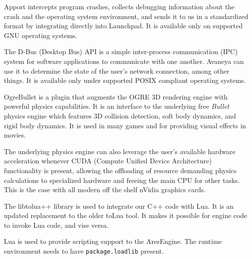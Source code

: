 \startitemize[4]
\setupwhitespace[big]

Apport intercepts program crashes, collects debugging information about the crash and the operating system environment, and sends it to us in a standardized format by integrating directly into Launchpad. It is available only on supported GNU operating systems.


The D-Bus (Desktop Bus) API is a simple inter-process communication (IPC) system for software applications to communicate with one another. Avaneya can use it to determine the state of the user's network connection, among other things. It is available only under supported POSIX compliant operating systems.
\stopitemize


\startitemize[4]
\setupwhitespace[big]

OgreBullet is a plugin that augments the OGRE 3D rendering engine with powerful physics capabilities. It is an interface to the underlying free {\it Bullet} physics engine which features 3D collision detection, soft body dynamics, and rigid body dynamics. It is used in many games and for providing visual effects in movies. 

The underlying physics engine can also leverage the user's available hardware acceleration whenever CUDA (Compute Unified Device Architecture) functionality is present, allowing the offloading of resource demanding physics calculations to specialized hardware and freeing the main CPU for other tasks. This is the case with all modern off the shelf nVidia graphics cards.
\stopitemize



\startitemize[4]
\setupwhitespace[big]

The libtolua++ library is used to integrate our C++ code with Lua. It is an updated replacement to the older toLua tool. It makes it possible for engine code to invoke Lua code, and vise versa.


Lua is used to provide scripting support to the AresEngine. The runtime environment needs to have {\tt package.loadlib} present.
\stopitemize

\StopChapter

